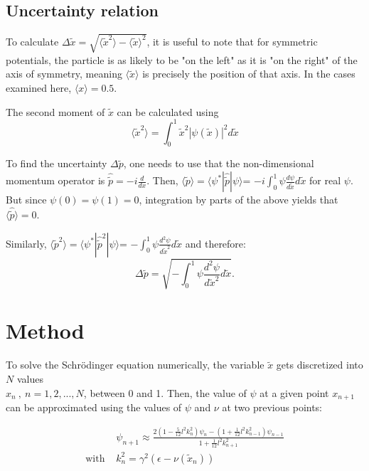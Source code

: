 \documentclass[11pt]{article}
\begin{document}
\subsection{Uncertainty relation}

To calculate $\Delta \tilde{x}=\sqrt{\langle \tilde{x}^2\rangle-\langle\tilde{x}\rangle^2}$,
it is useful to note that for symmetric potentials, the particle is as likely to be 
"on the left" as it is "on the right" of the axis of symmetry, meaning $\langle \tilde{x}\rangle$
is precisely the position of that axis. In the cases examined here, $\langle x \rangle=0.5$.

The second moment of $\tilde{x}$ can be calculated using
\begin{equation}
  \langle\tilde{x}^2\rangle=\int_0^1 \tilde{x}^2|\psi(\tilde{x})|^2d\tilde{x}
\end{equation}

To find the uncertainty $\Delta \tilde{p}$, one needs to use that the 
non-dimensional momentum operator is $\hat{\tilde{p}}=-i\frac{d}{dx}$.
Then, $\langle \tilde{p}\rangle=\langle\psi^*|\hat{\tilde{p}}|\psi\rangle$=
$-i\int_0^1\psi\frac{d\psi}{d\tilde{x}}d\tilde{x}$ for real $\psi$. But since
$\psi(0)=\psi(1)=0$, integration by parts of the above yields that
$\langle\hat{\tilde{p}}\rangle=0$.

Similarly, $\langle \tilde{p}^2\rangle=\langle\psi^*|\hat{\tilde{p}}^2|\psi\rangle$=
$-\int_0^1\psi\frac{d^2\psi}{d\tilde{x}^2}d\tilde{x}$ and therefore:
\begin{equation}
  \Delta\tilde{p}=\sqrt{-\int_0^1\psi\frac{d^2\psi}{d\tilde{x}^2}d\tilde{x}}.
\end{equation}

\section{Method}

To solve the Schr{\"o}dinger equation numerically, the variable $\tilde{x}$ gets
discretized into $N$ values\\
 $x_n\ ,\ n=1,2,...,N$, between 0 and 1. Then, 
the value of $\psi$ at a given point $x_{n+1}$ can be approximated using the
values of $\psi$ and $\nu$ at two previous points:

\begin{align} 
  &\psi_{n+1}\approx\frac{2(1-\frac{5}{12}l^2k_n^2)\psi_n-(1+\frac{1}{12}l^2k^2_{n-1})\psi_{n-1}}{1+\frac{1}{12}l^2k^2_{n+1}}
  \\\label{eq:4}
  \text{with }&k_n^2=\gamma^2(\epsilon-\nu(\tilde{x}_n))
\end{align}
\end{document}
